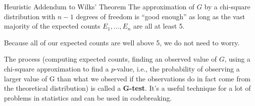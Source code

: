 \documentclass[letterpaper]{article}
\newcommand{\0}{\mathbf{0}}
\begin{document}
\begin{theorem}{Heuristic Addendum to Wilks' Theorem}{}
    The approximation of $G$ by a chi-square distribution with $n - 1$ degrees of freedom is ``good enough'' as long as the vast majority of the expected counts $E_1, \hdots, E_n$ are all at least 5.
\end{theorem}
Because all of our expected counts are well above 5, we do not need to worry. 

\bigskip 

The process (computing expected counts, finding an observed value of $G$, using a chi-square approximation to find a $p$-value, i.e., the probability of observing a larger value of G than what we observed if the observations do in fact come from the theoretical distribution) is called a \textbf{G-test}. It's a useful technique for a lot of problems in statistics and can be used in codebreaking. 
\end{document}
